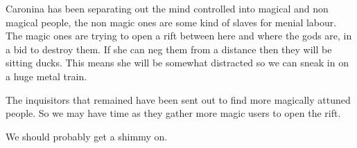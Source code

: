 Caronina has been separating out the mind controlled into magical and non magical people, the non magic ones are some kind of slaves for menial labour. The magic ones are trying to open a rift between here and where the gods are, in a bid to destroy them. If she can neg them from a distance then they will be sitting ducks. This means she will be somewhat distracted so we can sneak in on a huge metal train.\medskip

The inquisitors that remained have been sent out to find more magically attuned people. So we may have time as they gather more magic users to open the rift.\medskip

We should probably get a shimmy on.\medskip

\vspace*{5mm}
